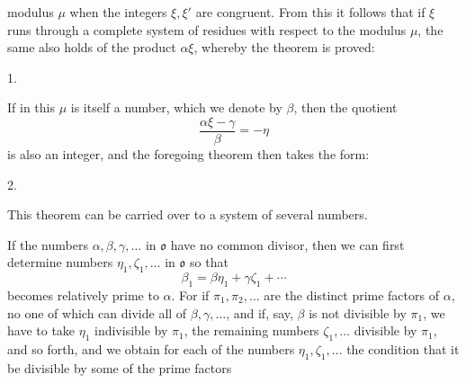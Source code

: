 modulus $\mu$ when the integers $\xi, \xi'$ are congruent. From this
it follows that if $\xi$ runs through a complete system of residues
with respect to the modulus $\mu$, the same also holds of the product
$\alpha\xi$, whereby the theorem is proved:

1. 

If in this $\mu$ is itself a number, which we denote by $\beta$, then
the quotient
\[
\frac{\alpha\xi - \gamma}{\beta} = -\eta
\]
is also an integer, and the foregoing theorem then takes the form:

2. 

This theorem can be carried over to a system of several numbers.

If the numbers $\alpha, \beta, \gamma, \ldots$ in $\mathfrak{o}$ have
no common divisor, then we can first determine numbers $\eta_1, \zeta_1,
\ldots$ in $\mathfrak{o}$ so that
\[
\beta_1 = \beta\eta_1 + \gamma\zeta_1 + \cdots
\]
becomes relatively prime to $\alpha$. For if $\pi_1, \pi_2,
\ldots$ are the distinct prime factors of $\alpha$, no one of which
can divide all of $\beta, \gamma, \ldots$, and if, say, $\beta$ is not
divisible by $\pi_1$, we have to take $\eta_1$ indivisible by $\pi_1$,
the remaining numbers $\zeta_1, \ldots$ divisible by $\pi_1$, and so
forth, and we obtain for each of the numbers $\eta_1, \zeta_1, \ldots$
the condition that it be divisible by some of the prime factors
